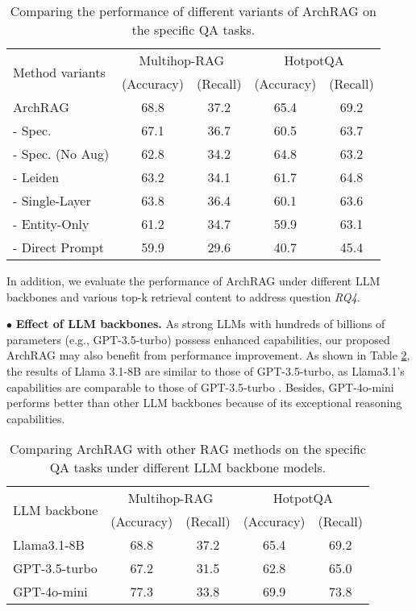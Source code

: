 \begin{table}[h]
    \centering
\caption{Comparing the performance of different variants of ArchRAG on the specific QA tasks.}
    \small
    \begin{tabular}{lcccc}
        \toprule
\multirow{2}{*}{Method variants} &  \multicolumn{2}{c}{Multihop-RAG} & \multicolumn{2}{c}{HotpotQA} \\
\cmidrule(lr){2-3} \cmidrule(lr){4-5}
        & (Accuracy) & (Recall) & (Accuracy) & (Recall)\\
\midrule
{ ArchRAG}  & 68.8 & 37.2 & 65.4 & 69.2 \\
\footnotesize{ - Spec.}  & 67.1 & 36.7 & 60.5 & 63.7 \\
\footnotesize{ - Spec. (No Aug)}  & 62.8 & 34.2 & 64.8 & 63.2 \\
\footnotesize{ - Leiden}  & 63.2 & 34.1 & 61.7 & 64.8 \\
\footnotesize{ - Single-Layer}  & 63.8 & 36.4 & 60.1 & 63.6 \\
\footnotesize{ - Entity-Only}  & 61.2 & 34.7 & 59.9 & 63.1 \\
\footnotesize{ - Direct Prompt}  & 59.9 & 29.6 & 40.7 & 45.4 \\
        \bottomrule
    \end{tabular}
    \label{tab:variant}
\end{table}

In addition, we evaluate the performance of ArchRAG under different LLM backbones and various top-k retrieval content to address question {\it RQ4}.

$\bullet$ \textbf{Effect of LLM backbones.}
As strong LLMs with hundreds of billions of parameters (e.g., GPT-3.5-turbo) possess enhanced capabilities, our proposed ArchRAG may also benefit from performance improvement.
% 
As shown in Table \ref{tab:backbone}, the results of Llama 3.1-8B are similar to those of GPT-3.5-turbo, as Llama3.1's capabilities are comparable to those of GPT-3.5-turbo \cite{dubey2024llama}.
%
Besides, GPT-4o-mini performs better than other LLM backbones because of its exceptional reasoning capabilities.

\begin{table}[h]
    \centering
    \caption{Comparing ArchRAG with other RAG methods on the specific QA tasks under different LLM backbone models.}
    \small
    \begin{tabular}{lcccc}
        \toprule
\multirow{2}{*}{LLM backbone} &  \multicolumn{2}{c}{Multihop-RAG} & \multicolumn{2}{c}{HotpotQA} \\
\cmidrule(lr){2-3} \cmidrule(lr){4-5}
        & (Accuracy) & (Recall) & (Accuracy) & (Recall)\\
\midrule
Llama3.1-8B &  68.8 & 37.2 & 65.4 & 69.2 \\
GPT-3.5-turbo & 67.2 & 31.5 & 62.8 & 65.0 \\
GPT-4o-mini & 77.3 & 33.8 & 69.9 & 73.8 \\
        \bottomrule
    \end{tabular}
    \label{tab:backbone}
\end{table}




